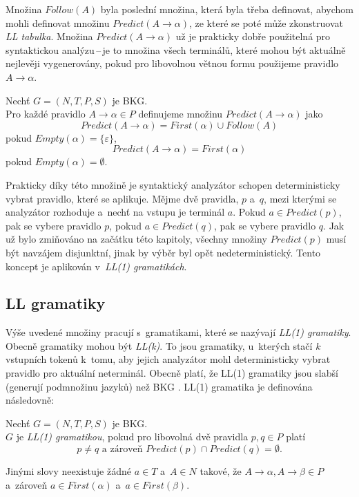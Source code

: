 Množina $Follow(A)$ byla poslední množina, která byla třeba definovat, abychom mohli definovat množinu $Predict(A \rightarrow \alpha)$, ze které se poté může zkonstruovat \emph{LL tabulka}.
Množina $Predict(A \rightarrow \alpha)$ už je prakticky dobře použitelná pro syntaktickou analýzu\,--\,je to množina všech terminálů, které mohou být aktuálně nejlevěji vygenerovány, pokud pro libovolnou větnou formu použijeme pravidlo $A \rightarrow \alpha$.
\begin{definition}
    Nechť $G = (N, T, P, S)$ je BKG.\\
    Pro každé pravidlo $A \rightarrow \alpha \in P$ definujeme množinu $Predict(A \rightarrow \alpha)$ jako
    \begin{equation*}
        Predict(A \rightarrow \alpha) = First(\alpha) \cup Follow(A)
    \end{equation*}
    pokud $Empty(\alpha) = \{\varepsilon\}$,
    \begin{equation*}
        Predict(A \rightarrow \alpha) = First(\alpha)
    \end{equation*}
    pokud $Empty(\alpha) = \emptyset$.
\end{definition}
Prakticky díky této množině je syntaktický analyzátor schopen deterministicky vybrat pravidlo, které se aplikuje.
Mějme dvě pravidla, $p$ a~$q$, mezi kterými se analyzátor rozhoduje a~nechť na vstupu je terminál $a$.
Pokud $a \in Predict(p)$, pak se vybere pravidlo $p$, pokud $a \in Predict(q)$, pak se vybere pravidlo $q$.
Jak už bylo zmiňováno na začátku této kapitoly, všechny množiny $Predict(p)$ musí být navzájem disjunktní, jinak by výběr byl opět nedeterministický.
Tento koncept je aplikován v~\emph{LL(1) gramatikách}.

\subsection*{LL gramatiky}

Výše uvedené množiny pracují s~gramatikami, které se nazývají \emph{LL(1) gramatiky}.
Obecně gramatiky mohou být \emph{LL(k)}.
To jsou gramatiky, u~kterých stačí $k$ vstupních tokenů k~tomu, aby jejich analyzátor mohl deterministicky vybrat pravidlo pro aktuální neterminál.
Obecně platí, že LL(1) gramatiky jsou slabší (generují podmnožinu jazyků) než BKG \cite{medunaElementsOfCompDesign}.
LL(1) gramatika je definována následovně:
\begin{definition}
    Nechť $G = (N, T, P, S)$ je BKG.\\
    $G$ je \emph{LL(1) gramatikou}, pokud pro libovolná dvě pravidla $p, q \in P$ platí
    \begin{equation*}
        p \neq q \text{ a zároveň } Predict(p) \cap Predict(q) = \emptyset.
    \end{equation*}
\end{definition}
Jinými slovy neexistuje žádné $a \in T$ a~$A \in N$ takové, že $A \rightarrow \alpha, A \rightarrow \beta \in P$ a~zároveň $a \in First(\alpha)$ a~$a \in First(\beta)$.

